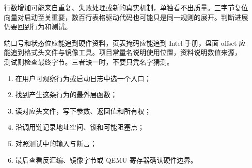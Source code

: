 行数增加可能来自重复、失败处理或新的真实机制，单独看不出质量。三字节复位
向量对启动至关重要，数百行表格驱动代码也可能只是同一规则的展开。判断进展
仍要回到行为和测试。

端口号和状态位应能追到硬件资料，页表掩码应能追到 Intel 手册，盘面 offset
应能追到格式头文件与镜像工具。项目常量名说明使用位置，资料说明数值来源，
测试则检查最终字节。三者缺一时，不要只凭名字猜测。

\begin{enumerate}[label=\arabic*.]
  \item 在用户可观察行为或启动日志中选一个入口；
  \item 找到产生这条行为的最外层函数；
  \item 读对应头文件，写下参数、返回值和所有权；
  \item 沿调用链记录地址空间、锁和可能阻塞点；
  \item 对照测试中的输入与断言；
  \item 最后查看反汇编、镜像字节或 QEMU 寄存器确认硬件边界。
\end{enumerate}
